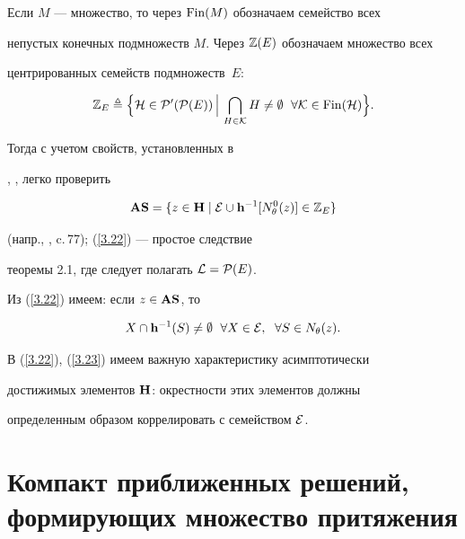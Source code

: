 {\begin{notes}
Если $M$ --- множество, то через ${\operatorname{Fin}}(M)$ обозначаем семейство всех


непустых конечных подмножеств $M$. Через ${\Bbb Z}(E)$ обозначаем множество всех


центрированных семейств подмножеств~$E$:


$$


{{\Bbb Z}_E} \triangleq \Big\{{\cal H} \in {{\cal P}'({\cal P}(E))}\,\Big|\,


\bigcap\limits_{H \in {\cal K}}{H} \ne \emp\ \;


\fo{\cal K} \in \Fin({\cal H})\Big\}. 


$$


Тогда с учетом свойств, установленных в


\cite{9}, \cite{10}, легко проверить 


\begin{equation}\label{3.22}


{{\bold A}{\bold S}} = \{z \in {\bold H} \mid


{\cal E}\cup{{\bold h}^{-1}}[{N_\theta^0}(z)] \in


{{\Bbb Z}_E}\}


\end{equation}


(напр., \cite{10}, c.\,77); (\ref{3.22}) --- простое следствие


теоремы 2.1, где следует полагать ${\cal L} = {{\cal P}(E)}$.


Из (\ref{3.22}) имеем: если $z \in {{\bold A}{\bold S}}$, то


\begin{equation}\label{3.23}


X\cap{{\bold h}^{-1}}(S) \ne \emp\ \; \fo{X} \in {\cal E},\ \;\fo{S} \in


{N_\theta}(z).


\end{equation}


В (\ref{3.22}), (\ref{3.23}) имеем важную характеристику асимптотически


достижимых элементов ${\bold H}$: окрестности этих элементов должны


определенным образом коррелировать с семейством ${\cal E}$.


\end{notes}








\section{Компакт приближенных решений, формирующих множество притяжения}





}
